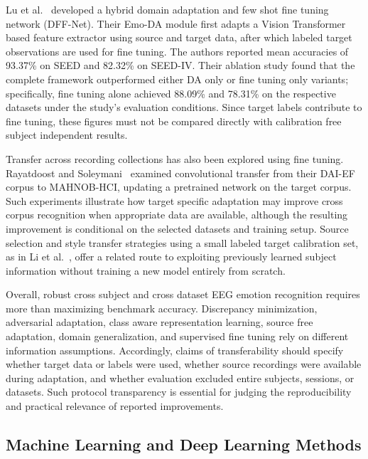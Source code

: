 \documentclass[ASNA,twocolumn]{USG}
\begin{document}
Lu et al.~\cite{lu2023hybrid} developed a hybrid domain adaptation and few shot fine tuning network (DFF-Net). Their Emo-DA module first adapts a Vision Transformer based feature extractor using source and target data, after which labeled target observations are used for fine tuning. The authors reported mean accuracies of 93.37\% on SEED and 82.32\% on SEED-IV. Their ablation study found that the complete framework outperformed either DA only or fine tuning only variants; specifically, fine tuning alone achieved 88.09\% and 78.31\% on the respective datasets under the study's evaluation conditions. Since target labels contribute to fine tuning, these figures must not be compared directly with calibration free subject independent results.

Transfer across recording collections has also been explored using fine tuning. Rayatdoost and Soleymani~\cite{rayatdoost2018cross} examined convolutional transfer from their DAI-EF corpus to MAHNOB-HCI, updating a pretrained network on the target corpus. Such experiments illustrate how target specific adaptation may improve cross corpus recognition when appropriate data are available, although the resulting improvement is conditional on the selected datasets and training setup. Source selection and style transfer strategies using a small labeled target calibration set, as in Li et al.~\cite{li2019multisource}, offer a related route to exploiting previously learned subject information without training a new model entirely from scratch.

Overall, robust cross subject and cross dataset EEG emotion recognition requires more than maximizing benchmark accuracy. Discrepancy minimization, adversarial adaptation, class aware representation learning, source free adaptation, domain generalization, and supervised fine tuning rely on different information assumptions. Accordingly, claims of transferability should specify whether target data or labels were used, whether source recordings were available during adaptation, and whether evaluation excluded entire subjects, sessions, or datasets. Such protocol transparency is essential for judging the reproducibility and practical relevance of reported improvements.


\subsection{Machine Learning and Deep Learning Methods}
\label{sec:ml_dl_methods}
\end{document}
